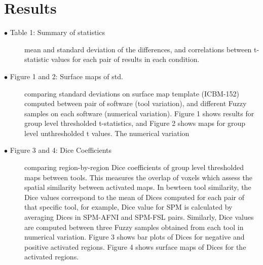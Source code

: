 \documentclass[runningheads]{llncs}
\begin{document}
\section{Results}


\begin{description}
  \item[$\bullet$ Table 1: Summary of statistics] mean and standard deviation of the differences, and correlations 
                  between t-statistic values for each pair of results in each condition.

  \item[$\bullet$ Figure 1 and 2: Surface maps of std.] comparing standard deviations on surface map template (ICBM-152)
                  computed between pair of software (tool variation), and different Fuzzy samples on each software (numerical variation).
                  Figure 1 shows results for group level thresholded t-statistics, and 
                  Figure 2 shows maps for group level unthresholded t values. The numerical variation 

  \item[$\bullet$ Figure 3 and 4: Dice Coefficients] comparing region-by-region Dice coefficients of group level thresholded maps between tools.
                  This measures the overlap of voxels which assess the spatial similarity between activated maps.
                  In bewteen tool similarity, the Dice values correspond to the mean of Dices computed for each pair of that specific tool,
                  for example, Dice value for SPM is calculated by averaging Dices in SPM-AFNI and SPM-FSL pairs.
                  Similarly, Dice values are computed between three Fuzzy samples obtained from each tool in numerical variation.
                  Figure 3 shows bar plots of Dices for negative and positive activated regions.
                  Figure 4 shows surface maps of Dices for the activated regions.



\end{description}
\end{document}

